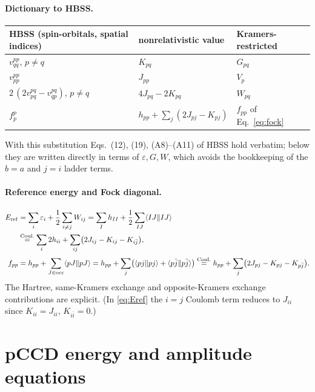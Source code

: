 \documentclass[11pt,a4paper]{article}
\newcommand{\kb}[1]{\bar{#1}}                 %
\newcommand{\asym}[4]{\langle #1 #2 \| #3 #4 \rangle}
\begin{document}
\paragraph{Dictionary to HBSS.}
\begin{center}
\begin{tabular}{lll}
\toprule
HBSS (spin-orbitals, spatial indices) & nonrelativistic value & Kramers-restricted \\
\midrule
$v^{pp}_{qq}$, $p\neq q$ & $K_{pq}$ & $G_{pq}$ \\
$v^{pp}_{pp}$ & $J_{pp}$ & $V_p$ \\
$2\,(2v^{pq}_{pq}-v^{pq}_{qp})$, $p\neq q$ & $4J_{pq}-2K_{pq}$ & $W_{pq}$ \\
$f^p_p$ & $h_{pp}+\sum_j(2J_{pj}-K_{pj})$ & $f_{pp}$ of Eq.~\eqref{eq:fock} \\
\bottomrule
\end{tabular}
\end{center}
With this substitution Eqs.~(12), (19), (A8)--(A11) of HBSS hold verbatim; below they are written
directly in terms of $\varepsilon,G,W$, which avoids the bookkeeping of the $b=a$ and $j=i$ ladder terms.

\paragraph{Reference energy and Fock diagonal.}
\begin{align}
  E_{\rm ref} &= \sum_i \varepsilon_i+\frac12\sum_{i\neq j}W_{ij}
    = \sum_{I}h_{II}+\frac12\sum_{IJ}\asym IJIJ \nonumber\\
  &\overset{\rm Coul.}{=} \sum_i 2h_{ii}+\sum_{ij}\bigl(2J_{ij}-K_{ij}-K_{i\kb j}\bigr),
  \label{eq:Eref}\\[2pt]
  f_{pp} &= h_{pp}+\sum_{J\in{\rm occ}}\asym pJpJ
          = h_{pp}+\sum_j\bigl(\asym pjpj+\asym p{\kb j}p{\kb j}\bigr)
     \overset{\rm Coul.}{=} h_{pp}+\sum_j\bigl(2J_{pj}-K_{pj}-K_{p\kb j}\bigr).
  \label{eq:fock}
\end{align}
The Hartree, same-Kramers exchange and opposite-Kramers exchange contributions are explicit.
(In \eqref{eq:Eref} the $i=j$ Coulomb term reduces to $J_{ii}$ since $K_{ii}=J_{ii}$, $K_{i\kb i}=0$.)

\section{pCCD energy and amplitude equations}
\end{document}
